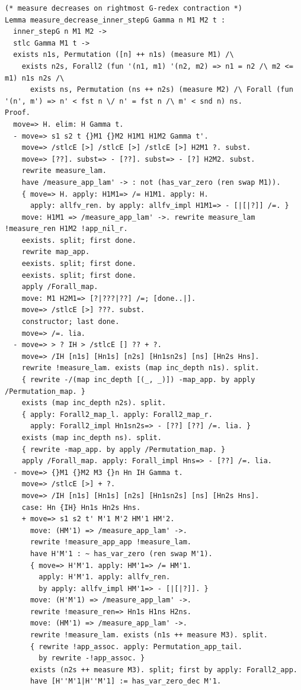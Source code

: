\documentclass[10pt,a4paper]{article}
\begin{document}
\begin{lstlisting}[style=authorcoq]
(* measure decreases on rightmost G-redex contraction *)
Lemma measure_decrease_inner_stepG Gamma n M1 M2 t :
  inner_stepG n M1 M2 ->
  stlc Gamma M1 t ->
  exists n1s, Permutation ([n] ++ n1s) (measure M1) /\
    exists n2s, Forall2 (fun '(n1, m1) '(n2, m2) => n1 = n2 /\ m2 <= m1) n1s n2s /\
      exists ns, Permutation (ns ++ n2s) (measure M2) /\ Forall (fun '(n', m') => n' < fst n \/ n' = fst n /\ m' < snd n) ns.
Proof.
  move=> H. elim: H Gamma t.
  - move=> s1 s2 t {}M1 {}M2 H1M1 H1M2 Gamma t'.
    move=> /stlcE [>] /stlcE [>] /stlcE [>] H2M1 ?. subst.
    move=> [??]. subst=> - [??]. subst=> - [?] H2M2. subst.
    rewrite measure_lam.
    have /measure_app_lam' -> : not (has_var_zero (ren swap M1)).
    { move=> H. apply: H1M1=> /= H1M1. apply: H.
      apply: allfv_ren. by apply: allfv_impl H1M1=> - [|[|?]] /=. }
    move: H1M1 => /measure_app_lam' ->. rewrite measure_lam !measure_ren H1M2 !app_nil_r.
    eexists. split; first done.
    rewrite map_app.
    eexists. split; first done.
    eexists. split; first done.
    apply /Forall_map.
    move: M1 H2M1=> [?|???|??] /=; [done..|].
    move=> /stlcE [>] ???. subst.
    constructor; last done.
    move=> /=. lia.
  - move=> > ? IH > /stlcE [] ?? + ?.
    move=> /IH [n1s] [Hn1s] [n2s] [Hn1sn2s] [ns] [Hn2s Hns].
    rewrite !measure_lam. exists (map inc_depth n1s). split.
    { rewrite -/(map inc_depth [(_, _)]) -map_app. by apply /Permutation_map. }
    exists (map inc_depth n2s). split.
    { apply: Forall2_map_l. apply: Forall2_map_r.
      apply: Forall2_impl Hn1sn2s=> - [??] [??] /=. lia. }
    exists (map inc_depth ns). split.
    { rewrite -map_app. by apply /Permutation_map. }
    apply /Forall_map. apply: Forall_impl Hns=> - [??] /=. lia.
  - move=> {}M1 {}M2 M3 {}n Hn IH Gamma t.
    move=> /stlcE [>] + ?.
    move=> /IH [n1s] [Hn1s] [n2s] [Hn1sn2s] [ns] [Hn2s Hns].
    case: Hn {IH} Hn1s Hn2s Hns.
    + move=> s1 s2 t' M'1 M'2 HM'1 HM'2.
      move: (HM'1) => /measure_app_lam' ->.
      rewrite !measure_app_app !measure_lam.
      have H'M'1 : ~ has_var_zero (ren swap M'1).
      { move=> H'M'1. apply: HM'1=> /= HM'1.
        apply: H'M'1. apply: allfv_ren.
        by apply: allfv_impl HM'1=> - [|[|?]]. }
      move: (H'M'1) => /measure_app_lam' ->.
      rewrite !measure_ren=> Hn1s H1ns H2ns.
      move: (HM'1) => /measure_app_lam' ->.
      rewrite !measure_lam. exists (n1s ++ measure M3). split.
      { rewrite !app_assoc. apply: Permutation_app_tail.
        by rewrite -!app_assoc. }
      exists (n2s ++ measure M3). split; first by apply: Forall2_app.
      have [H''M'1|H''M'1] := has_var_zero_dec M'1.

\end{lstlisting}
\end{document}
